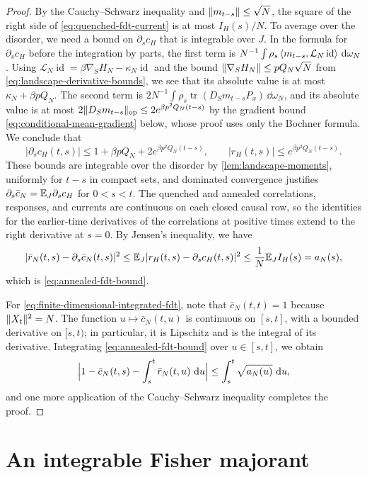 \begin{proof}
By the Cauchy--Schwarz inequality and $\lVert m_{t-s}\rVert\le\sqrt N$, the square of the right side of \eqref{eq:quenched-fdt-current} is at most $I_H(s)/N$. To average over the disorder, we need a bound on $\partial_sc_H$ that is integrable over $J$. In the formula for $\partial_sc_H$ before the integration by parts, the first term is $N^{-1}\int\rho_s\left\langle m_{t-s},\mathcal L_N\operatorname{id}\right\rangle\,\mathop{}\!\mathrm d\omega_N$. Using $\mathcal L_N\operatorname{id}=\beta\nabla_SH_N-\kappa_N\operatorname{id}$ and the bound $\lVert\nabla_SH_N\rVert\le pQ_N\sqrt N$ from \eqref{eq:landscape-derivative-bounds}, we see that its absolute value is at most $\kappa_N+\beta pQ_N$. The second term is $2N^{-1}\int\rho_s\operatorname{tr}(D_Sm_{t-s}P_x)\,\dd\omega_N$, and its absolute value is at most $2\lVert D_Sm_{t-s}\rVert_{\mathrm{op}}\le2e^{\beta p^2Q_N(t-s)}$ by the gradient bound \eqref{eq:conditional-mean-gradient} below, whose proof uses only the Bochner formula. We conclude that
\[
 |\partial_sc_H(t,s)|\le1+\beta pQ_N+2e^{\beta p^2Q_N(t-s)},
 \qquad
 |r_H(t,s)|\le e^{\beta p^2Q_N(t-s)}.
\]
These bounds are integrable over the disorder by \cref{lem:landscape-moments}, uniformly for $t-s$ in compact sets, and dominated convergence justifies $\partial_s\bar c_N=\mathbb E_J\partial_sc_H$ for $0<s<t$. The quenched and annealed correlations, responses, and currents are continuous on each closed causal row, so the identities for the earlier-time derivatives of the correlations at positive times extend to the right derivative at $s=0$. By Jensen's inequality, we have
\[
 |\bar r_N(t,s)-\partial_s\bar c_N(t,s)|^2\le\mathbb E_J|r_H(t,s)-\partial_sc_H(t,s)|^2\le\frac1N\mathbb E_JI_H(s)=a_N(s),
\]
which is \eqref{eq:annealed-fdt-bound}.

For \eqref{eq:finite-dimensional-integrated-fdt}, note that $\bar c_N(t,t)=1$ because $\lVert X_t\rVert^2=N$. The function $u\mapsto\bar c_N(t,u)$ is continuous on $[s,t]$, with a bounded derivative on $[s,t)$; in particular, it is Lipschitz and is the integral of its derivative. Integrating \eqref{eq:annealed-fdt-bound} over $u\in[s,t]$, we obtain
\[
 \Bigl|1-\bar c_N(t,s)-\int_s^t\bar r_N(t,u)\,\mathop{}\!\mathrm d u\Bigr|
 \le\int_s^t\sqrt{a_N(u)}\,\mathop{}\!\mathrm d u,
\]
and one more application of the Cauchy--Schwarz inequality completes the proof.
\end{proof}

\section{An integrable Fisher majorant}\label{sec:fisher-majorant}

